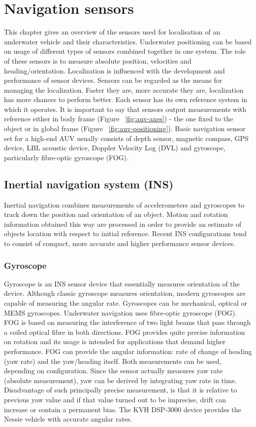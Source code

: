 \chapter{Navigation sensors} \label{chap:sensors}
This chapter gives an overview of the sensors used for localisation of an underwater vehicle and their characteristics. Underwater positioning can be based on usage of different types of sensors combined together in one system. The role of these sensors is to measure absolute position, velocities and heading/orientation. Localization is influenced with the development and performance of sensor devices. Sensors can be regarded as the means for managing the localization. Faster they are, more accurate they are, localization has more chances to perform better. Each sensor has its own reference system in which it operates. It is important to say that sensors output measurements with reference either in body frame (Figure ~\ref{fig:auv-axes}) - the one fixed to the object or in global frame (Figure ~\ref{fig:auv-positioning}). Basic navigation sensor set for a high-end AUV usually consists of depth sensor, magnetic compass, GPS device, LBL acoustic device, Doppler Velocity Log (DVL) and gyroscope, particularly fibre-optic gyroscope (FOG).   
\section{Inertial navigation system (INS)} \label{sec:ins}
Inertial navigation combines measurements of accelerometers and gyroscopes to track down the position and orientation of an object. Motion and rotation information obtained this way are processed in order to provide an estimate of objects location with respect to  initial reference. Recent INS configurations tend to consist of compact, more accurate and higher performance sensor devices.  
\subsection{Gyroscope}
Gyroscope is an INS sensor device that essentially measures orientation of the device. Although classic gyroscope measures orientation, modern gyroscopes are capable of measuring the angular rate. Gyroscopes can be mechanical, optical or MEMS gyroscopes. Underwater navigation uses fibre-optic gyroscope (FOG). FOG is based on measuring the interference of two light beams that pass through a coiled optical fibre in both directions. FOG provides quite precise information on rotation and its usage is intended for applications that demand higher performance. 
FOG can provide the angular information: rate of change of heading (yaw rate) and the yaw/heading itself. Both measurements can be used, depending on configuration. Since the sensor actually measures yaw rate (absolute measurement), yaw can be derived by integrating yaw rate in time. Disadvantage of such principally precise measurement, is that it is relative to previous yaw value and if that value turned out to be imprecise, drift can increase or contain a permanent bias. The KVH DSP-3000 device provides the Nessie vehicle with accurate angular rates.
